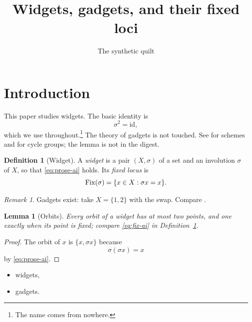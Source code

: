 \documentclass{amsart}
\title{Widgets, gadgets, and their fixed loci}
\author{The synthetic quilt}
\theoremstyle{plain}
\newtheorem{lemma}[theorem]{Lemma}
\theoremstyle{definition}
\newtheorem{definition}[theorem]{Definition}
\theoremstyle{remark}
\newtheorem{remark}[theorem]{Remark}
\begin{document}
\maketitle

\section{Introduction}\label{sy-0100-ai}

This paper studies widgets. The basic identity is
\begin{equation}\label{eq:prose-ai}
\sigma^2 = \mathrm{id},
\end{equation}
which we use throughout.\footnote{The name comes from nowhere.} The \GW{} theory of gadgets is not touched. See \cite[Chapter II]{Har77} for schemes and \cite[Theorem 2.1]{Kre99} for cycle groups; the lemma \cite[Lemma 9]{Kre99} is not in the digest.

\begin{definition}[Widget]\label{sy-0001-ai}
A \emph{widget} is a pair $(X,\sigma)$ of a set and an involution $\sigma$ of $X$, so that \eqref{eq:prose-ai} holds. Its \emph{fixed locus} is
\begin{equation}\label{eq:fix-ai}
\operatorname{Fix}(\sigma) = \{x \in X : \sigma x = x\}.
\end{equation}
\end{definition}


\begin{remark}\label{sy-000A-ai}
Gadgets exist: take $X = \{1,2\}$ with the swap. Compare \cite[Theorem 2.1]{Kre99}.
\end{remark}

\begin{lemma}[Orbits]\label{sy-0002-ai}
Every orbit of a widget has at most two points, and one exactly when its point is fixed; compare \eqref{eq:fix-ai} in Definition~\ref{sy-0001-ai}.
\end{lemma}
\begin{proof}
The orbit of $x$ is $\{x, \sigma x\}$ because
\begin{equation}\label{eq:step-ai}
\sigma(\sigma x) = x
\end{equation}
by \eqref{eq:prose-ai}.
\end{proof}


\begin{itemize}
\item widgets,
\item gadgets.
\end{itemize}
\end{document}
